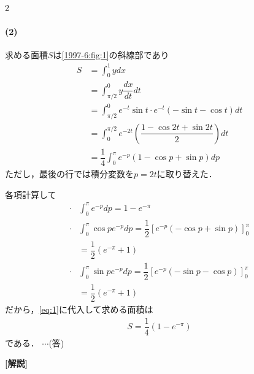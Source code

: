 \documentclass[../../main.tex]{subfiles}
\begin{document}
\begin{multicols}{2}
  \paragraph{(2)}
  求める面積$S$は\cref{1997-6:fig:1}の斜線部であり
  \begin{align}
    S & = \int_0^{1} y dx                                                           \\
    & = \int_{\pi/2}^{0} y \dfrac{dx}{dt} dt                                       \\
    & = \int_{\pi/2}^{0} e^{-t}\sin t \cdot e^{-t}(-\sin t-\cos t) dt             \\
    & = \int_0^{\pi/2} e^{-2t} \left(\dfrac{1-\cos 2t+\sin 2t}{2}\right) dt        \\
    & = \dfrac{1}{4}\int_0^{\pi} e^{-p} (1-\cos p + \sin p) dp \label{eq:1}
  \end{align}
  ただし，最後の行では積分変数を$p=2t$に取り替えた．

  各項計算して
  \begin{align}
    \cdot & \int_0^{\pi} e^{-p} dp
    = 1 - e^{-\pi}                                                \\
    \cdot & \int_0^{\pi} \cos p e^{-p} dp
    = \dfrac{1}{2} \left[e^{-p}(-\cos p + \sin p)\right]_{0}^{\pi} \\
    & = \dfrac{1}{2}(e^{-\pi}+1)                             \\
    \cdot & \int_0^{\pi} \sin p e^{-p} dp
    = \dfrac{1}{2} \left[e^{-p}(-\sin p - \cos p)\right]_{0}^{\pi} \\
    & = \dfrac{1}{2}(e^{-\pi}+1)
  \end{align}
  だから，\cref{eq:1}に代入して求める面積は
  \begin{align}
    S = \dfrac{1}{4}\left(1-e^{-\pi}\right)
  \end{align}
  である．  $\cdots$(答)

  {\bf [解説]}
  \newpage
\end{multicols}
\end{document}
